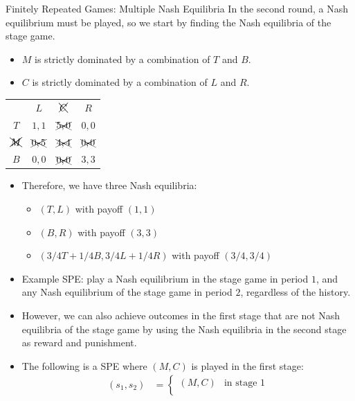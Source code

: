 \documentclass[8pt]{extarticle}
\begin{document}
\begin{problem}{Finitely Repeated Games: Multiple Nash Equilibria}
    In the second round, a Nash equilibrium must be played, so we start by finding the Nash equilibria of the stage game.
    \begin{itemize}
      \item $M$ is strictly dominated by a combination of $T$ and $B$.
      \item $C$ is strictly dominated by a combination of $L$ and $R$.
    \end{itemize}
    \begin{center}
      \renewcommand{\arraystretch}{1.5}
      \begin{tabular}{c|c|c|c|}
        \multicolumn{1}{c}{} & \multicolumn{1}{c}{$L$}& \multicolumn{1}{c}{$\xcancel{C}$}& \multicolumn{1}{c}{$R$}\\
        \cline{2-4}
        $T$ & $1,1$ & $\xcancel{5,0}$ & $0,0$\\
        \cline{2-4}
        $\xcancel{M}$ & $\xcancel{0,5}$ & $\xcancel{4,4}$ & $\xcancel{0,0}$\\
        \cline{2-4}
        $B$ & $0,0$ & $\xcancel{0,0}$ & $3,3$\\
        \cline{2-4}
      \end{tabular}
    \end{center}
    \begin{itemize}
      \item Therefore, we have three Nash equilibria:
        \begin{itemize}
          \item $(T,L)$ with payoff $(1,1)$
          \item $(B,R)$ with payoff $(3,3)$
          \item $(3/4T + 1/4B,3/4L + 1/4R)$ with payoff $(3/4,3/4)$
        \end{itemize}
      \item Example SPE: play a Nash equilibrium in the stage game in period $1$, and any Nash equilibrium of the stage game in period $2$, regardless of the history.
      \item However, we can also achieve outcomes in the first stage that are not Nash equilibria of the stage game by using the Nash equilibria in the second stage as reward and punishment.
      \item The following is a SPE where $(M,C)$ is played in the first stage:
        \begin{align*}
          (s_1,s_2) &= \begin{cases}
            (M,C) & \text{in stage 1}\\

\end{cases}
\end{align*}
\end{itemize}
\end{problem}
\end{document}
